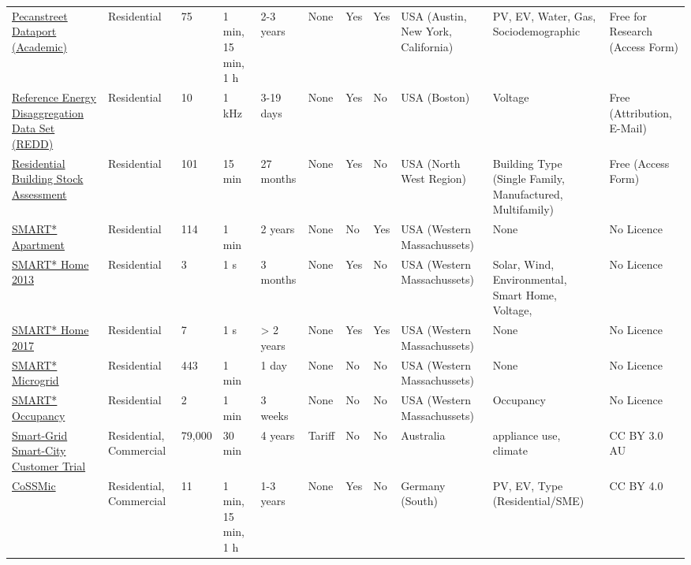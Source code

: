 \begin{tabular}{lllllllllll}
\href{\url{https://www.pecanstreet.org/dataport/}}{Pecanstreet Dataport (Academic)} & Residential &75 &  1  min, 15 min, 1 h &2-3 years &  None & Yes & Yes & USA (Austin, New York, California) &   PV, EV, Water, Gas, Sociodemographic & Free for Research (Access Form) \\
\href{\url{http://redd.csail.mit.edu/}}{Reference Energy Disaggregation Data Set (REDD)} & Residential &10 &1 kHz &3-19 days &  None & Yes &  No &   USA (Boston) &Voltage &  Free (Attribution, E-Mail) \\
\href{\url{https://neea.org/resources/rbsa-ii-combined-database}}{Residential Building Stock Assessment} & Residential &   101 &   15 min &27 months &  None & Yes &  No &USA (North West Region) &   Building Type (Single Family, Manufactured, Multifamily) &  Free (Access Form) \\
\href{\url{http://lass.cs.umass.edu/projects/smart/}}{SMART* Apartment} & Residential &   114 &1 min &  2 years &  None &  No & Yes &USA (Western Massachussets) &   None &  No Licence \\
\href{\url{http://lass.cs.umass.edu/projects/smart/}}{SMART* Home 2013} & Residential & 3 &  1 s & 3 months &  None & Yes &  No &USA (Western Massachussets) &   Solar, Wind, Environmental, Smart Home, Voltage, &  No Licence \\
\href{\url{http://lass.cs.umass.edu/projects/smart/}}{SMART* Home 2017} & Residential & 7 &  1 s &> 2 years &  None & Yes & Yes &USA (Western Massachussets) &   None &  No Licence \\
\href{\url{http://lass.cs.umass.edu/projects/smart/}}{SMART* Microgrid} & Residential &   443 &1 min &1 day &  None &  No &  No &USA (Western Massachussets) &   None &  No Licence \\
\href{\url{http://lass.cs.umass.edu/projects/smart/}}{SMART* Occupancy} & Residential & 2 &1 min &  3 weeks &  None &  No &  No &USA (Western Massachussets) &  Occupancy &  No Licence \\
\href{\url{https://data.gov.au/data/dataset/smart-grid-smart-city-customer-trial-data}}{Smart-Grid Smart-City Customer Trial} & Residential, Commercial &79,000 &   30 min &  4 years &Tariff &  No &  No &  Australia & appliance use, climate &CC BY 3.0 AU \\
\href{\url{https://data.open-power-system-data.org/household_data/}}{CoSSMic} & Residential, Commercial &11 &   1 min, 15 min, 1 h &1-3 years &  None & Yes &  No &Germany (South) & PV, EV, Type (Residential/SME) &   CC BY 4.0 \\

\end{tabular}

